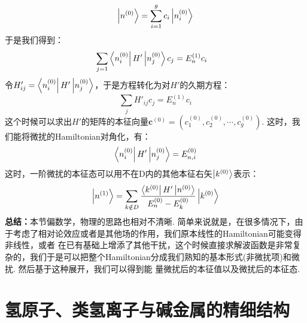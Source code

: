 \[
\ket{n^{(0)}} = \sum_{i=1}^{g}c_{i}\ket{n_{i}^{(0)}}
\]
于是我们得到：
\begin{align*}
& \sum_{j=1}\bra{n_{i}^{(0)}}H'\ket{n_{j}^{(0)}}c_{j} = E_{n}^{(1)}c_{i}
\end{align*}
令\(H'_{ij}=\bra{n_{i}^{(0)}}H'\ket{n_{j}^{(0)}}\)，于是方程转化为对\(H'\)的久期方程：
\[
\sum_{j}H'_{ij}c_{j} = E_{n}^{(1)}c_{i}
\]
这个时候可以求出\(H'\)的矩阵的本征向量\(\mathbf{c}^{(0)} =(c_{1}^{(0)},c_{2}^{(0)},\cdots,c_{g}^{(0)})\). 这时，我们能将微扰的Hamiltonian对角化，有：
\[
\bra{n_{i}^{(0)}}H'\ket{n_{j}^{(0)}} = E_{n,i}^{(0)}
\]
这时，一阶微扰的本征态可以用不在D内的其他本征右矢\(\ket{k^{(0)}}\)表示：
\[
\ket{n^{(1)}} = \sum_{k\notin D}\frac{\bra{k^{(0)}}H'\ket{n^{(0)}}}{E_{n}^{(0)} - E_{k}^{(0)}}\ket{k^{(0)}}
\]
\textbf{总结：}本节偏数学，物理的思路也相对不清晰. 简单来说就是，在很多情况下，由于考虑了相对论效应或者是其他场的作用，我们原本线性的Hamiltonian可能变得非线性，或者
在已有基础上增添了其他干扰，这个时候直接求解波函数是非常复杂的，我们于是可以把整个Hamiltonian分成我们熟知的基本形式(非微扰项)和微扰. 然后基于这种展开，我们可以得到能
量微扰后的本征值以及微扰后的本征态. 
\section{氢原子、类氢离子与碱金属的精细结构}
